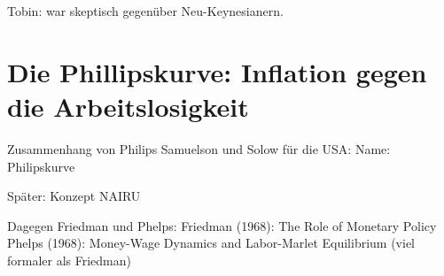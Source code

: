 Tobin: war skeptisch gegenüber Neu-Keynesianern. \textcite[S. 398]{Snowdon2005}

\section{Die Phillipskurve: Inflation gegen die Arbeitslosigkeit} \label{sec: Phillips}

Zusammenhang von Philips
Samuelson und Solow für die USA: Name: Philipskurve


Später: Konzept NAIRU


Dagegen Friedman und Phelps:
Friedman (1968): The Role of Monetary Policy
Phelps (1968): Money-Wage Dynamics and Labor-Marlet Equilibrium (viel formaler als Friedman)



